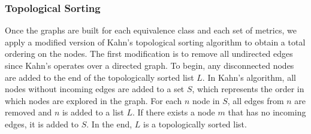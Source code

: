 \subsubsection{Topological Sorting}
Once the graphs are built for each equivalence class and each set of metrics, we apply a modified version of Kahn's topological sorting algorithm to obtain a total ordering on the nodes. 
The first modification is to remove all undirected edges since Kahn's operates over a directed graph. 
To begin, any disconnected nodes are added to the end of the topologically sorted list $L$. 
In Kahn's algorithm, all nodes without incoming edges are added to a set $S$, which represents the order in which nodes are explored in the graph. For each $n$ node in $S$, all edges from $n$ are removed and $n$ is added to a list $L$. If there exists a node $m$ that has no incoming edges, it is added to $S$.  In the end, $L$ is a topologically sorted list.


